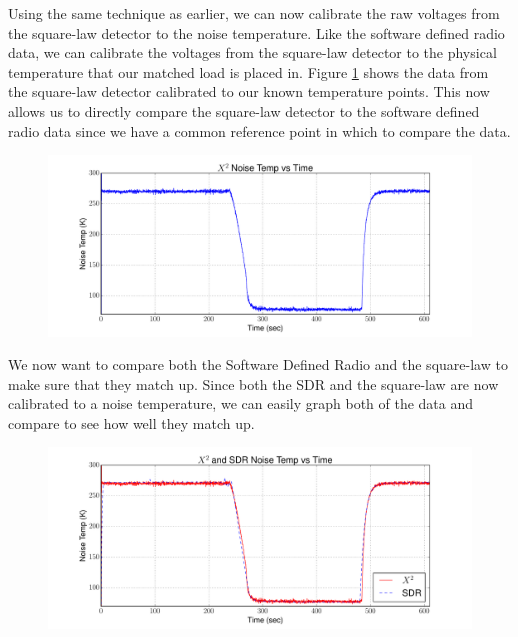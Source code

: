 {Using the same technique as earlier, we can now calibrate the raw voltages from the square-law detector to the noise temperature.  Like the software defined radio data, we can calibrate the voltages from the square-law detector to the physical temperature that our matched load is placed in.  Figure \ref{X2_Calibrated} shows the data from the square-law detector calibrated to our known temperature points.  This now allows us to directly compare the square-law detector to the software defined radio data since we have a common reference point in which to compare the data.

\begin{figure}[h!tb] \centering
\includegraphics[width=\textwidth]{Experiments/Exp1/x2_calibrated.pdf}
\label{X2_Calibrated}
\end{figure}

We now want to compare both the Software Defined Radio and the square-law to make sure that they match up.  Since both the SDR and the square-law are now calibrated to a noise temperature, we can easily graph both of the data and compare to see how well they match up.

\begin{figure}[h!tb] \centering

\includegraphics[width=\textwidth]{Experiments/Exp1/x2_SDR_Calibrated.pdf}
\label{X2_SDR_Both}
\end{figure}

}
